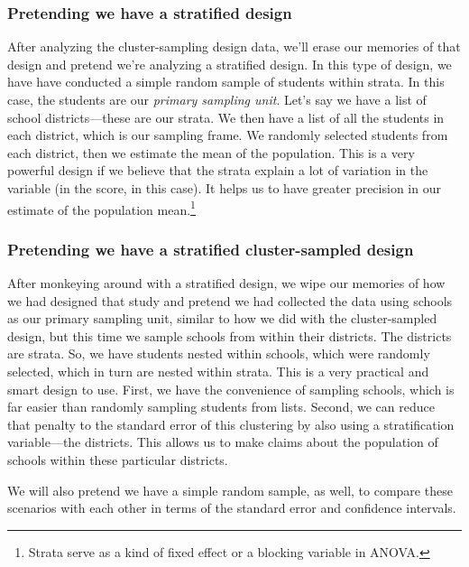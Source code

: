 \documentclass[
]{article}
\begin{document}
\hypertarget{pretending-we-have-a-stratified-design}{%
\subsubsection{Pretending we have a stratified design}\label{pretending-we-have-a-stratified-design}}

After analyzing the cluster-sampling design data, we'll erase our memories of that design and pretend we're analyzing a stratified design. In this type of design, we have have conducted a simple random sample of students within strata. In this case, the students are our \emph{primary sampling unit}. Let's say we have a list of school districts---these are our strata. We then have a list of all the students in each district, which is our sampling frame. We randomly selected students from each district, then we estimate the mean of the population. This is a very powerful design if we believe that the strata explain a lot of variation in the variable (in the score, in this case). It helps us to have greater precision in our estimate of the population mean.\footnote{Strata serve as a kind of fixed effect or a blocking variable in ANOVA.}

\hypertarget{pretending-we-have-a-stratified-cluster-sampled-design}{%
\subsubsection{Pretending we have a stratified cluster-sampled design}\label{pretending-we-have-a-stratified-cluster-sampled-design}}

After monkeying around with a stratified design, we wipe our memories of how we had designed that study and pretend we had collected the data using schools as our primary sampling unit, similar to how we did with the cluster-sampled design, but this time we sample schools from within their districts. The districts are strata. So, we have students nested within schools, which were randomly selected, which in turn are nested within strata. This is a very practical and smart design to use. First, we have the convenience of sampling schools, which is far easier than randomly sampling students from lists. Second, we can reduce that penalty to the standard error of this clustering by also using a stratification variable---the districts. This allows us to make claims about the population of schools within these particular districts.

We will also pretend we have a simple random sample, as well, to compare these scenarios with each other in terms of the standard error and confidence intervals.
\end{document}
